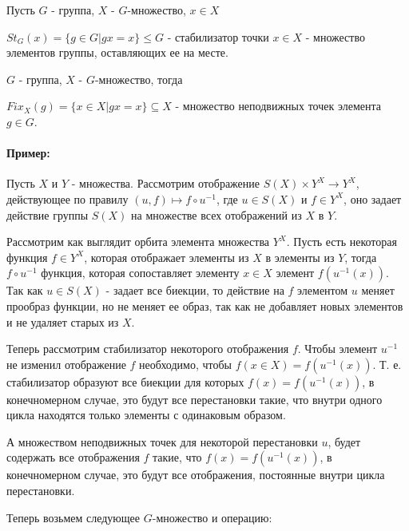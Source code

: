 \begin{Def}
Пусть $G$ - группа, $X$ - $G$-множество, $x \in X$

$St_G\left(x\right) = \lbrace g \in G | gx = x\rbrace \le G$ - стабилизатор точки $x \in X$ - множество элементов группы, оставляющих ее на месте.
\end{Def}

\begin{Def}
$G$ - группа, $X$ - $G$-множество, тогда

$Fix_X\left(g\right) = \lbrace x \in X | gx = x\rbrace \subseteq X$ - множество неподвижных точек элемента $g \in G$.
\end{Def}

\paragraph{Пример: }
Пусть $X$ и $Y$ - множества. Рассмотрим отображение $S\left(X\right) \times Y^X \rightarrow Y^X$, действующее по правилу $\left(u, f\right) \mapsto f \circ u^{-1}$, где $u \in S\left(X\right)$ и $f \in Y^X$, оно задает действие группы $S\left(X\right)$ на множестве всех отображений из $X$ в $Y$.

Рассмотрим как выглядит орбита элемента множества $Y^X$. Пусть есть некоторая функция $f \in Y^X$, которая отображает элементы из $X$ в элементы из $Y$, тогда $f \circ u^{-1}$ функция, которая сопоставляет элементу $x \in X$ элемент $f\left(u^{-1}\left(x\right)\right)$. Так как $u \in S\left(X\right)$ - задает все биекции, то действие на $f$ элементом $u$ меняет прообраз функции, но не меняет ее образ, так как не добавляет новых элементов и не удаляет старых из $X$.

Теперь рассмотрим стабилизатор некоторого отображения $f$. Чтобы элемент $u^{-1}$ не изменил отображение $f$ необходимо, чтобы $f\left(x \in X\right) = f\left(u^{-1}\left(x\right)\right)$. Т. е. стабилизатор образуют все биекции для которых $f\left(x\right) = f\left(u^{-1}\left(x\right)\right)$, в конечномерном случае, это будут все перестановки такие, что внутри одного цикла находятся только элементы с одинаковым образом.

А множеством неподвижных точек для некоторой перестановки $u$, будет содержать все отображения $f$ такие, что $f\left(x\right) = f\left(u^{-1}\left(x\right)\right)$, в конечномерном случае, это будут все отображения, постоянные внутри цикла перестановки.

Теперь возьмем следующее $G$-множество и операцию:

